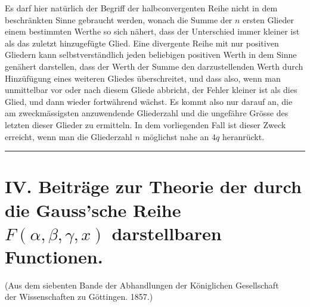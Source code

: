 \documentclass[12pt,a4paper]{article}
\begin{document}
Es darf hier natürlich der Begriff der halbconvergenten Reihe nicht in dem beschränkten Sinne gebraucht werden, wonach die Summe der $n$ ersten Glieder einem bestimmten Werthe so sich nähert, dass der Unterschied immer kleiner ist als das zuletzt hinzugefügte Glied. Eine divergente Reihe mit nur positiven Gliedern kann selbstverständlich jeden beliebigen positiven Werth in dem Sinne genähert darstellen, dass der Werth der Summe den darzustellenden Werth durch Hinzüfügung eines weiteren Gliedes überschreitet, und dass also, wenn man unmittelbar vor oder nach diesem Gliede abbricht, der Fehler kleiner ist als dies Glied, und dann wieder fortwährend wächst. Es kommt also nur darauf an, die am zweckmässigsten anzuwendende Gliederzahl und die ungefähre Grösse des letzten dieser Glieder zu ermitteln. In dem vorliegenden Fall ist dieser Zweck erreicht, wenn man die Gliederzahl $n$ möglichst nahe an $4q$ heranrückt.

\vspace{2em}
\begin{center}
\rule{0.5\textwidth}{0.4pt}
\end{center}
\vspace{1em}


\section*{IV. Beiträge zur Theorie der durch die Gauss'sche Reihe\\
$F(\alpha, \beta, \gamma, x)$ darstellbaren Functionen.}

\begin{center}
\small
(Aus dem siebenten Bande der Abhandlungen der Königlichen Gesellschaft\\
der Wissenschaften zu Göttingen. 1857.)
\end{center}
\vspace{0.5em}
\end{document}
